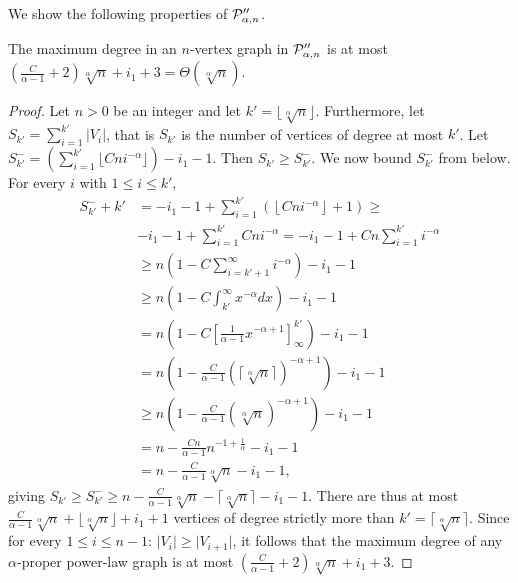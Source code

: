 We show the following properties of $ \mathcal{P}''_{\alpha,n}$. 
\begin{proposition}\label{prop:maxvertexproper}\label{prop:maxdegree}
The maximum degree in an $n$-vertex graph in $ \mathcal{P}''_{\alpha,n}$ is at most $\left(\frac{C}{\alpha - 1} + 2\right) \sqrt[\alpha]{n} + i_1 + 3 = \Theta(\sqrt[\alpha]n)$.
\end{proposition}

\begin{proof}
Let $n > 0$ be an integer and let $k' = \lfloor \sqrt[\alpha]{n} \rfloor$. 
Furthermore, let $S_{k'} = \sum_{i=1}^{k'} \vert V_i\vert$, that is $S_{k'}$ is the number of vertices of degree at most $k'$. Let $S^{-}_{k'} = (\sum_{i=1}^{k'} \lfloor Cni^{-\alpha}\rfloor) - i_1 - 1$. Then
$S_{k'} \geq S^{-}_{k'}$. We now bound $S^{-}_{k'}$ from below.
For every $i$ with $1 \leq i \leq k'$,
\begin{align*}
S^{-}_{k'} + k' & = -i_1 - 1 + \sum_{i=1}^{k'} \left(\left\lfloor Cn i^{-\alpha}\right\rfloor + 1\right) \geq \\ 
 &-i_1 - 1 + \sum_{i=1}^{k'} Cn i^{- \alpha}  = -i_1 - 1 + Cn \sum_{i=1}^{k'} i^{-\alpha} \\
    & \geq n \left(1 - C\sum_{i=k'+1}^{\infty} i^{-\alpha} \right) - i_1 - 1 \\
    & \geq n \left( 1 - C\int_{k'}^\infty x^{-\alpha} dx \right) - i_1 - 1\\
 & = n \left( 1 - C\left[ \frac{1}{\alpha - 1} x^{-\alpha + 1}\right]_{\infty}^{k'}\right) - i_1 - 1 \\
 & = n \left( 1 - \frac{C}{\alpha - 1} \left( \lceil\sqrt[\alpha]{n} \rceil \right)^{-\alpha + 1}\right) - i_1 - 1\\
 & \geq n \left( 1 -  \frac{C}{\alpha - 1} \left(\sqrt[\alpha]{n}\right)^{-\alpha + 1} \right) - i_1 - 1 \\
 & = n - \frac{Cn}{\alpha - 1}n^{-1+\frac{1}{\alpha}} - i_1 - 1\\
 & = n - \frac{C}{\alpha - 1}\sqrt[\alpha]{n} - i_1 - 1,
\end{align*}
giving $S_{k'} \geq S^{-}_{k'} \geq n - \frac{C}{\alpha - 1}\sqrt[\alpha]{n} - \lceil \sqrt[\alpha]{n} \rceil - i_1 - 1$. There are thus at most $\frac{C}{\alpha - 1} \sqrt[\alpha]{n} + \lfloor \sqrt[\alpha]{n} \rfloor + i_1 + 1$ vertices of degree strictly more than $k' = \lceil \sqrt[\alpha]{n} \rceil$. Since for every $1 \leq i \leq n-1$: $\vert V_i \vert \geq \vert V_{i+1} \vert$, it follows that the maximum degree of any $\alpha$-proper power-law graph is at most $\left(\frac{C}{\alpha - 1} + 2\right) \sqrt[\alpha]{n} + i_1 + 3$.
\end{proof}

